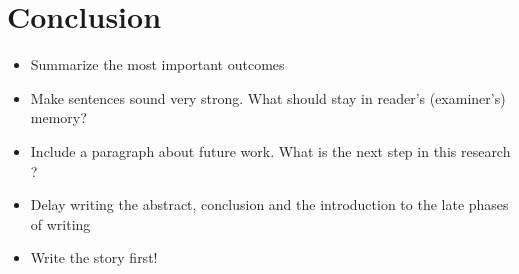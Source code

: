 \section{Conclusion}
\begin{itemize}
\item Summarize the most important outcomes
\item Make sentences sound very strong. What should stay in reader's (examiner's) memory?
\item Include a paragraph about future work. What is the next step in this research ?
\item Delay writing the abstract, conclusion and the introduction to the late phases of writing
\item Write the story first!
\end{itemize}